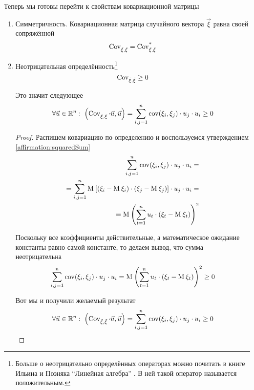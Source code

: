 Теперь мы готовы перейти к свойствам ковариационной матрицы
\begin{enumerate}
  \item Симметричность. Ковариационная матрица случайного вектора $\vec{\xi}$
      равна своей сопряжённой
      $$\operatorname{Cov^{}_{\vec{\xi}, \vec{\xi}}} = \operatorname{Cov^{*}_{\vec{\xi}, \vec{\xi}}}$$
  \item Неотрицательная определённость\footnote{Больше о неотрицательно
      определённых операторах можно почитать в книге Ильина и Позняка
      ``Линейная алгебра'' \cite[с.~139]{IlinPoznyarLA}.
      В ней такой оператор называется положительным.}
      $$\operatorname{Cov^{}_{\vec{\xi}, \vec{\xi}}} \ge 0$$

      Это значит следующее
      $$\forall \vec{u} \in \mathbb{R}^n:\;
      \left( \operatorname{Cov^{}_{\vec{\xi}, \vec{\xi}}} \cdot \vec{u}, \vec{u} \right)
      = \sum_{i,j=1}^{n} \operatorname{cov}\!\left( \xi_i, \xi_j \right) \cdot u_j \cdot u_i
      \ge 0$$

      \begin{proof}
      Распишем ковариацию по определению и воспользуемся утверждением
      \ref{affirmation:squaredSum}
      \begin{align*}
          \sum_{i,j=1}^{n} \operatorname{cov}\!\left( \xi_i, \xi_j \right) \cdot u_j \cdot u_i = \\
          = \sum_{i,j=1}^{n} \operatorname{M}_{} \left[ \left( \xi_i - \operatorname{M}_{} \xi_i \right)
            \cdot \left( \xi_j - \operatorname{M}_{} \xi_j \right) \right]
            \cdot u_j \cdot u_i =\\
          = \operatorname{M}_{} \left( \sum_{t=1}^{n} u_t
        \cdot \left( \xi_t - \operatorname{M}_{} \xi_t \right) \right)^2
      \end{align*}

      Поскольку все коэффициенты действительные, а математическое
      ожидание константы равно самой константе, то делаем вывод,
      что сумма неотрицательна
      $$\sum_{i,j=1}^{n} \operatorname{cov}\!\left( \xi_i, \xi_j \right) \cdot u_j \cdot u_i
          = \operatorname{M}_{} \left( \sum_{t=1}^{n} u_t
        \cdot \left( \xi_t - \operatorname{M}_{} \xi_t \right) \right)^2
          \ge 0$$

      Вот мы и получили желаемый результат
      $$\forall \vec{u} \in \mathbb{R}^n:\;
          \left( \operatorname{Cov^{}_{\vec{\xi}, \vec{\xi}}} \cdot \vec{u}, \vec{u} \right)
          = \sum_{i,j=1}^{n} \operatorname{cov}\!\left( \xi_i, \xi_j \right) \cdot u_j \cdot u_i
          \ge 0$$
      \end{proof}
\end{enumerate}

